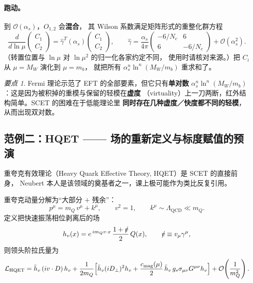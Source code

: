 \documentclass[UTF8,a4paper,11pt]{ctexart}
\theoremstyle{definition}
\theoremstyle{remark}
\newtheorem{keypoint}{要点}[section]
\theoremstyle{plain}
\newcommand{\vsl}{v\mkern-9.0mu/}
\newcommand{\as}{\alpha_s}
\newcommand{\LQCD}{\Lambda_{\mathrm{QCD}}}
\newcommand{\en}[1]{\textsf{#1}}   %
\begin{document}
\paragraph{跑动。}到 $\mathcal O(\as)$，$O_{1,2}$ 会\textbf{混合}，
其 Wilson 系数满足矩阵形式的重整化群方程
\begin{equation}
  \frac{d}{d\ln\mu}\begin{pmatrix}C_1\\C_2\end{pmatrix}
  =\hat\gamma^{T}(\as)\begin{pmatrix}C_1\\C_2\end{pmatrix},
  \qquad
  \hat\gamma=\frac{\as}{4\pi}
  \begin{pmatrix}-6/N_c & 6\\ 6 & -6/N_c\end{pmatrix}+\mathcal O(\as^2).
  \label{eq:admatrix}
\end{equation}
（转置位置与 $\ln\mu$ 对 $\ln\mu^2$ 的归一化各家约定不同，
使用时请核对来源。）把 $C_i$ 从 $\mu=M_W$ 演化到 $\mu=m_b$，
就把所有 $\as^n\ln^n(M_W/m_b)$ 重求和了。

\begin{keypoint}
Fermi 理论示范了 EFT 的全部要素，但它只有\textbf{单对数}
$\as^n\ln^n(M_W/m_b)$：这是因为被积掉的重模与保留的轻模在\textbf{虚度}
（\en{virtuality}）上一刀两断，红外结构简单。SCET 的困难在于低能理论里
\textbf{同时存在几种虚度／快度都不同的轻模}，从而出现双对数。
\end{keypoint}

\subsection{范例二：HQET —— 场的重新定义与标度赋值的预演}
\label{subsec:hqet}

重夸克有效理论（\en{Heavy Quark Effective Theory}, HQET）是 SCET 的直接前身，
Neubert 本人是该领域的奠基者之一，课上极可能作为类比反复引用。

重夸克动量分解为“大部分 $+$ 残余”：
\begin{equation}
  p^\mu = m_Q\, v^\mu + k^\mu ,
  \qquad v^2=1,\qquad k^\mu\sim\LQCD\ll m_Q .
  \label{eq:hqetmom}
\end{equation}
定义把快速振荡相位剥离后的场
\begin{equation}
  h_v(x)=e^{\,i m_Q v\cdot x}\,\frac{1+\vsl}{2}\,Q(x),
  \qquad \vsl\equiv v_\mu\gamma^\mu ,
\end{equation}
则领头阶拉氏量为
\begin{equation}
  \mathcal L_{\rm HQET}
  =\bar h_v\,(i v\cdot D)\,h_v
   +\frac{1}{2m_Q}\Big[\bar h_v (iD_\perp)^2 h_v
   +\frac{c_{\rm mag}(\mu)}{2}\,\bar h_v\, g_s\sigma_{\mu\nu}G^{\mu\nu} h_v\Big]
   +\mathcal O\!\left(\frac{1}{m_Q^2}\right).
  \label{eq:lhqet}
\end{equation}
\end{document}

